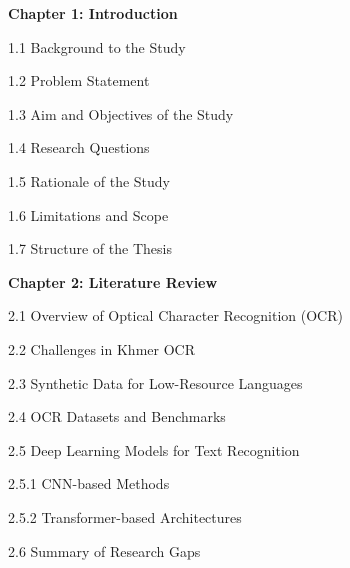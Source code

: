 \begin{adjustwidth}{0.2cm}{0.2cm}
    \vspace{0.5cm}
    {\large \textbf{Chapter 1: Introduction}\dotfill\pageref{ch:introduction}\par}
    {\large 1.1 Background to the Study\dotfill\pageref{sec:background}\par}
    {\large 1.2 Problem Statement\dotfill\pageref{sec:problem}\par}
    {\large 1.3 Aim and Objectives of the Study\dotfill\pageref{sec:objectives}\par}
    {\large 1.4 Research Questions\dotfill\pageref{sec:questions}\par}
    {\large 1.5 Rationale of the Study\dotfill\pageref{sec:rationale}\par}
    {\large 1.6 Limitations and Scope\dotfill\pageref{sec:limitations}\par}
    {\large 1.7 Structure of the Thesis\dotfill\pageref{sec:structure}\par}

    \vspace{0.5cm}
    {\large \textbf{Chapter 2: Literature Review}\dotfill\pageref{ch:literature}\par}
    {\large 2.1 Overview of Optical Character Recognition (OCR)\dotfill\pageref{sec:ocr-overview}\par}
    {\large 2.2 Challenges in Khmer OCR\dotfill\pageref{sec:khmer-challenges}\par}
    {\large 2.3 Synthetic Data for Low-Resource Languages\dotfill\pageref{sec:synthetic-data}\par}
    {\large 2.4 OCR Datasets and Benchmarks\dotfill\pageref{sec:datasets}\par}
    {\large 2.5 Deep Learning Models for Text Recognition\dotfill\pageref{sec:dl-models}\par}
    {\large \hspace{1cm}2.5.1 CNN-based Methods\dotfill\pageref{subsec:cnn}\par}
    {\large \hspace{1cm}2.5.2 Transformer-based Architectures\dotfill\pageref{subsec:transformer}\par}
    {\large 2.6 Summary of Research Gaps\dotfill\pageref{sec:gaps}\par}


\end{adjustwidth}
